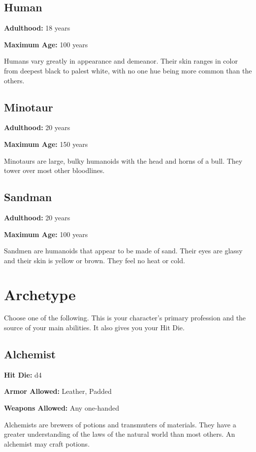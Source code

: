 \begin{multicols}{2}
\subsection{Human}

\textbf{Adulthood:} 18 years

\textbf{Maximum Age:} 100 years

Humans vary greatly in appearance and demeanor. Their skin ranges in color
from deepest black to palest white, with no one hue being more common than
the others.

\subsection{Minotaur}

\textbf{Adulthood:} 20 years

\textbf{Maximum Age:} 150 years

Minotaurs are large, bulky humanoids with the head and horns of a bull. They
tower over most other bloodlines.

\subsection{Sandman}

\textbf{Adulthood:} 20 years

\textbf{Maximum Age:} 100 years

Sandmen are humanoids that appear to be made of sand. Their eyes are glassy and
their skin is yellow or brown. They feel no heat or cold.

\section{Archetype}

Choose one of the following. This is your character's primary profession and
the source of your main abilities. It also gives you your Hit Die.

\subsection{Alchemist}

\textbf{Hit Die:} d4

\textbf{Armor Allowed:} Leather, Padded

\textbf{Weapons Allowed:} Any one-handed

Alchemists are brewers of potions and transmuters of materials. They have a
greater understanding of the laws of the natural world than most others. An
alchemist may craft potions.


\end{multicols}
